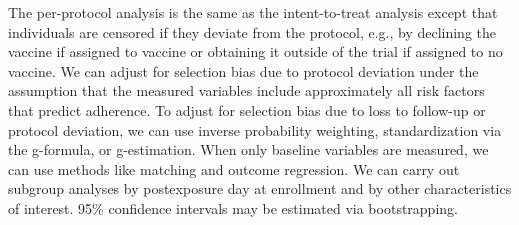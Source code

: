 \documentclass[11pt]{article}
\begin{document}
The per-protocol analysis is the same as the intent-to-treat analysis except that individuals are censored if they deviate from the protocol, e.g., by declining the vaccine if assigned to vaccine or obtaining it outside of the trial if assigned to no vaccine. We can adjust for selection bias due to protocol deviation under the assumption that the measured variables include approximately all risk factors that predict adherence. To adjust for selection bias due to loss to follow-up or protocol deviation, we can use inverse probability weighting, standardization via the g-formula, or g-estimation. When only baseline variables are measured, we can use methods like matching and outcome regression. We can carry out subgroup analyses by postexposure day at enrollment and by other characteristics of interest. 95\% confidence intervals may be estimated via bootstrapping.

\end{document}
